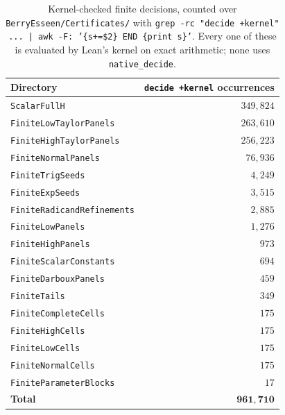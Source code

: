 \documentclass[10pt,a4paper]{article}
\theoremstyle{plain}
\theoremstyle{definition}
\newcommand{\lean}[1]{\texttt{#1}}
\newcommand{\file}[1]{\texttt{#1}}
\begin{document}
\begin{table}[ht]
\centering
\begin{tabular}{@{}lr@{}}
\toprule
Directory & \lean{decide +kernel} occurrences \\
\midrule
\file{ScalarFullH}                  & $349{,}824$ \\
\file{FiniteLowTaylorPanels}        & $263{,}610$ \\
\file{FiniteHighTaylorPanels}       & $256{,}223$ \\
\file{FiniteNormalPanels}           & $76{,}936$ \\
\file{FiniteTrigSeeds}              & $4{,}249$ \\
\file{FiniteExpSeeds}               & $3{,}515$ \\
\file{FiniteRadicandRefinements}    & $2{,}885$ \\
\file{FiniteLowPanels}              & $1{,}276$ \\
\file{FiniteHighPanels}             & $973$ \\
\file{FiniteScalarConstants}        & $694$ \\
\file{FiniteDarbouxPanels}          & $459$ \\
\file{FiniteTails}                  & $349$ \\
\file{FiniteCompleteCells}          & $175$ \\
\file{FiniteHighCells}              & $175$ \\
\file{FiniteLowCells}               & $175$ \\
\file{FiniteNormalCells}            & $175$ \\
\file{FiniteParameterBlocks}        & $17$ \\
\midrule
\textbf{Total} & $\mathbf{961{,}710}$ \\
\bottomrule
\end{tabular}
\caption{Kernel-checked finite decisions, counted over
\file{BerryEsseen/Certificates/} with
\texttt{grep -rc "decide +kernel" ... | awk -F: '\{s+=\$2\} END \{print s\}'}.
Every one of these is evaluated by Lean's kernel on exact arithmetic; none uses
\lean{native\_decide}.}
\label{tab:kernel}
\end{table}
\end{document}
